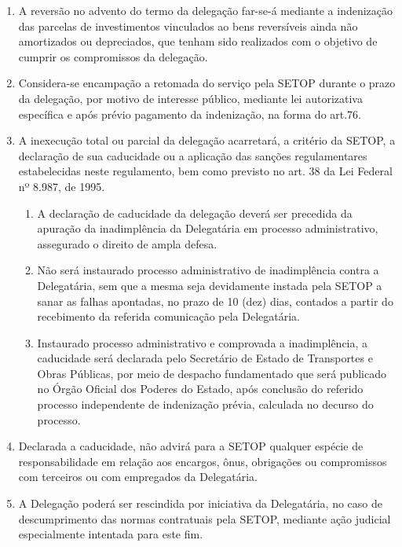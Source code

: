 \begin{enumerate}[resume, label=Art. \arabic*]
\item A reversão no advento do termo da delegação far-se-á mediante a indenização das parcelas de investimentos vinculados ao bens reversíveis ainda não amortizados ou depreciados, que tenham sido realizados com o objetivo de cumprir os compromissos da delegação.

\item Considera-se encampação a retomada do serviço pela SETOP durante o prazo da delegação, por motivo de interesse público, mediante lei autorizativa específica e após prévio pagamento da indenização, na forma do art.76.

\item A inexecução total ou parcial da delegação acarretará, a critério da SETOP, a declaração de sua caducidade ou a aplicação das sanções regulamentares estabelecidas neste regulamento, bem como previsto no art. 38 da Lei Federal nº 8.987, de 1995.

\begin{enumerate}[label= \S \arabic*] %

\item A declaração de caducidade da delegação deverá ser precedida da apuração da inadimplência da Delegatária em processo administrativo, assegurado o direito de ampla defesa.

\item Não será instaurado processo administrativo de inadimplência contra a Delegatária, sem que a mesma seja devidamente instada pela SETOP a sanar as falhas apontadas, no prazo de 10 (dez) dias, contados a partir do recebimento da referida comunicação pela Delegatária.

\item Instaurado processo administrativo e comprovada a inadimplência, a caducidade será declarada pelo Secretário de Estado de Transportes e Obras Públicas, por meio de despacho fundamentado que será publicado no Órgão Oficial dos Poderes do Estado, após conclusão do referido processo independente de indenização prévia, calculada no decurso do processo.

\end{enumerate}

\item Declarada a caducidade, não advirá para a SETOP qualquer espécie de responsabilidade em relação aos encargos, ônus, obrigações ou compromissos com terceiros ou com empregados da Delegatária.

\item A Delegação poderá ser rescindida por iniciativa da Delegatária, no caso de descumprimento das normas contratuais pela SETOP, mediante ação judicial especialmente intentada para este fim.


\end{enumerate}
